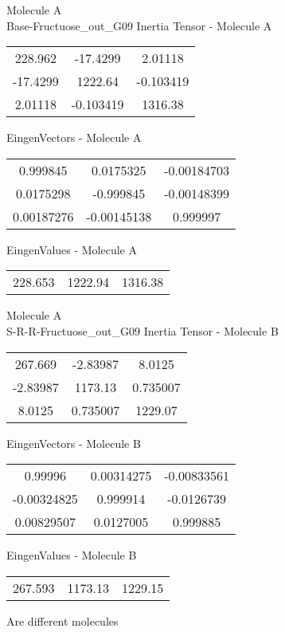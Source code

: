 \newpage
\begin{multicols}{2}
\begin{center}
Molecule A \\ 
Base-Fructuose_out_G09
Inertia Tensor - Molecule A \\
\vtab
\begin{tabular}{|c c c|}
228.962	 & 	-17.4299	 & 	2.01118	 \\
-17.4299	 & 	1222.64	 & 	-0.103419	 \\
2.01118	 & 	-0.103419	 & 	1316.38
\end{tabular}

\vtab
 EingenVectors - Molecule A     \\
\vtab
\begin{tabular}{|c c c|}
0.999845	 & 	0.0175325	 & 	-0.00184703	 \\
0.0175298	 & 	-0.999845	 & 	-0.00148399	 \\
0.00187276	 & 	-0.00145138	 & 	0.999997
\end{tabular}

\vtab
 EingenValues - Molecule A     \\
\vtab
\begin{tabular}{|c c c|}
228.653	 & 	1222.94	 & 	1316.38
\end{tabular}
\columnbreak
Molecule A \\ 
S-R-R-Fructuose_out_G09
Inertia Tensor - Molecule B \\
\vtab
\begin{tabular}{|c c c|}
267.669	 & 	-2.83987	 & 	8.0125	 \\
-2.83987	 & 	1173.13	 & 	0.735007	 \\
8.0125	 & 	0.735007	 & 	1229.07
\end{tabular}

\vtab
 EingenVectors - Molecule B     \\
\vtab
\begin{tabular}{|c c c|}
0.99996	 & 	0.00314275	 & 	-0.00833561	 \\
-0.00324825	 & 	0.999914	 & 	-0.0126739	 \\
0.00829507	 & 	0.0127005	 & 	0.999885
\end{tabular}

\vtab
 EingenValues - Molecule B     \\
\vtab
\begin{tabular}{|c c c|}
267.593	 & 	1173.13	 & 	1229.15
\end{tabular}
\textcolor{NavyBlue}{\large Are different molecules}
\end{center}
\end{multicols}
